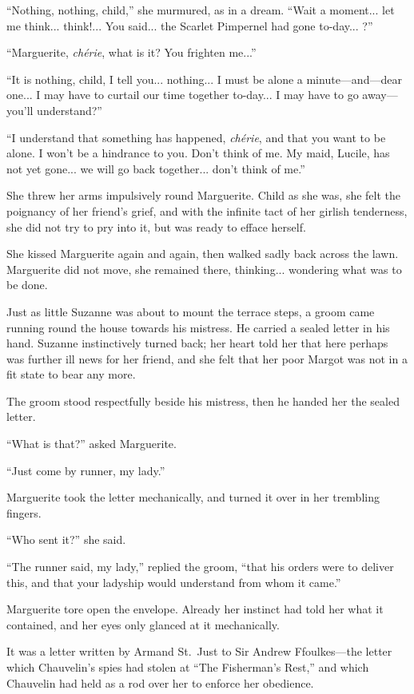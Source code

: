 \documentclass[paper=a5,BCOR=7mm,twoside,DIV=calc,12pt,usegeometry,chapterprefix,endperiod,headings=big]{scrbook}
\begin{document}
\enquote{Nothing, nothing, child,} she murmured, as in a dream. \enquote{Wait a moment... let me think... think!... You said... the Scarlet Pimpernel had gone to-day... ?}

\enquote{Marguerite, \textit{chérie}, what is it? You frighten me...}

\enquote{It is nothing, child, I tell you... nothing... I must be alone a minute---and---dear one... I may have to curtail our time together to-day... I may have to go away---you'll understand?}

\enquote{I understand that something has happened, \textit{chérie}, and that you want to be alone. I won't be a hindrance to you. Don't think of me. My maid, Lucile, has not yet gone... we will go back together... don't think of me.}

She threw her arms impulsively round Marguerite. Child as she was, she felt the poignancy of her friend's grief, and with the infinite tact of her girlish tenderness, she did not try to pry into it, but was ready to efface herself.

She kissed Marguerite again and again, then walked sadly back across the lawn. Marguerite did not move, she remained there, thinking... wondering what was to be done.

Just as little Suzanne was about to mount the terrace steps, a groom came running round the house towards his mistress. He carried a sealed letter in his hand. Suzanne instinctively turned back; her heart told her that here perhaps was further ill news for her friend, and she felt that her poor Margot was not in a fit state to bear any more.

The groom stood respectfully beside his mistress, then he handed her the sealed letter.

\enquote{What is that?} asked Marguerite.

\enquote{Just come by runner, my lady.}

Marguerite took the letter mechanically, and turned it over in her trembling fingers.

\enquote{Who sent it?} she said.

\enquote{The runner said, my lady,} replied the groom, \enquote{that his orders were to deliver this, and that your ladyship would understand from whom it came.}

Marguerite tore open the envelope. Already her instinct had told her what it contained, and her eyes only glanced at it mechanically.

It was a letter written by Armand St.~Just to Sir Andrew Ffoulkes---the letter which Chauvelin's spies had stolen at \enquote{The Fisherman's Rest,} and which Chauvelin had held as a rod over her to enforce her obedience.
\end{document}
